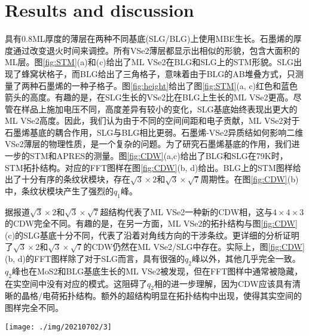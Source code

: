 \documentclass[reprint, aps, prb, showkeys]{revtex4-2}
\begin{document}
\section{Results and discussion}
具有0.8ML厚度的薄层在两种不同基底(SLG/BLG)上使用MBE生长。石墨烯的厚度通过改变退火时间来调控。所有VSe2薄层都显示出相似的形貌，包含大面积的ML层。图\ref{fig:STM}(a)和(c)给出了ML VSe2在BLG和SLG上的STM形貌。SLG出现了蜂窝状格子，而BLG给出了三角格子，意味着由于BLG的AB堆叠方式，只测量了两种石墨烯的一种子格子。图\ref{fig:height}给出了图\ref{fig:STM}(a, c)红色和蓝色箭头的高度。有趣的是，在SLG生长的VSe2比在BLG上生长的ML VSe2更高。尽管在样品上施加电压不同，高度差异有较小的变化，SLG基底始终表现出更大的ML VSe2高度。因此，我们认为由于不同的空间间距和电子贡献，ML VSe2对于石墨烯基底的耦合作用，SLG与BLG相比更弱。石墨烯-VSe2异质结如何影响二维VSe2薄层的物理性质，是一个复杂的问题。为了研究石墨烯基底的作用，我们进一步的STM和APRES的测量。图\ref{fig:CDW}(a,c)给出了BLG和SLG在79K时，STM拓扑结构。对应的FFT图样在图\ref{fig:CDW}(b, d)给出。BLG上的STM图样给出了十分有序的条纹状模块，存在$\sqrt{3} \times 2$和$\sqrt{3} \times \sqrt{7}$周期性。在图\ref{fig:CDW}(b)中，条纹状模块产生了强烈的$q_1$峰。

据报道$\sqrt{3} \times 2$和$\sqrt{3} \times \sqrt{7}$超结构代表了ML VSe2一种新的CDW相，这与$4 \times 4 \times 3$的CDW完全不同。有趣的是，在另一方面，ML VSe2的拓扑结构与图\ref{fig:CDW}(c)的SLG基底十分不同，代表了沿着对角线方向的干涉条纹。更详细的分析证明了$\sqrt{3} \times 2$和$\sqrt{3} \times \sqrt{7}$的CDW仍然在ML VSe2/SLG中存在。实际上，图\ref{fig:CDW}(b, d)的FFT图样除了对于SLG而言，具有很强的$q_2$峰以外，其他几乎完全一致。$q_2$峰也在MoS2和BLG基底生长的ML VSe2被发现，但在FFT图样中通常被隐藏，在实空间中没有对应的模式。这阻碍了$q_2$相的进一步理解，因为CDW应该具有清晰的晶格/电荷拓扑结构。额外的超结构明显在拓扑结构中出现，使得其实空间的图样完全不同。
\begin{figure*}[t]
    \texttt{[image: ./img/20210702/3]}
    \caption{\label{fig:CDW} 
    CDW phases of ML VSe2 films on BLG and SLG.
    }
\end{figure*}
\end{document}
